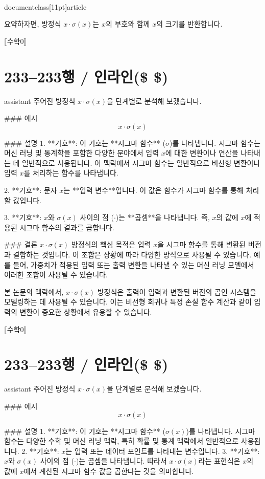 \\documentclass[11pt]{article}
\begin{document}
요약하자면, 방정식 \( x \cdot \sigma(x) \)는 \( x \)의 부호와 함께 \( x \)의 크기를 반환합니다.

⟦수학0⟧

\section*{233–233행 / 인라인(\$ \$) }
assistant
주어진 방정식 \( x \cdot \sigma(x) \)을 단계별로 분석해 보겠습니다.

### 예시
\[ x \cdot \sigma(x) \]

### 설명
1. **기호**: 이 기호는 **시그마 함수** (\(\sigma\))를 나타냅니다. 시그마 함수는 머신 러닝 및 통계학을 포함한 다양한 분야에서 입력 \(x\)에 대한 변환이나 연산을 나타내는 데 일반적으로 사용됩니다. 이 맥락에서 시그마 함수는 일반적으로 비선형 변환이나 입력 \(x\)를 처리하는 함수를 나타냅니다.

2. **기호**: 문자 \(x\)는 **입력 변수**입니다. 이 값은 함수가 시그마 함수를 통해 처리할 값입니다.

3. **기호**: \(x\)와 \(\sigma(x)\) 사이의 점 (\(\cdot\))는 **곱셈**을 나타냅니다. 즉, \(x\)의 값에 \(x\)에 적용된 시그마 함수의 결과를 곱합니다.

### 결론
\( x \cdot \sigma(x) \) 방정식의 핵심 목적은 입력 \(x\)을 시그마 함수를 통해 변환된 버전과 결합하는 것입니다. 이 조합은 상황에 따라 다양한 방식으로 사용될 수 있습니다. 예를 들어, 가중치가 적용된 입력 또는 출력 변환을 나타낼 수 있는 머신 러닝 모델에서 이러한 조합이 사용될 수 있습니다.

본 논문의 맥락에서, \( x \cdot \sigma(x) \) 방정식은 출력이 입력과 변환된 버전의 곱인 시스템을 모델링하는 데 사용될 수 있습니다. 이는 비선형 회귀나 특정 손실 함수 계산과 같이 입력의 변환이 중요한 상황에서 유용할 수 있습니다.

⟦수학0⟧

\section*{233–233행 / 인라인(\$ \$) }
assistant
주어진 방정식 \( x \cdot \sigma(x) \)을 단계별로 분석해 보겠습니다.

### 예시
\[ x \cdot \sigma(x) \]

### 설명
1. **기호**: 이 기호는 **시그마 함수** (\(\sigma(x)\))를 나타냅니다. 시그마 함수는 다양한 수학 및 머신 러닝 맥락, 특히 확률 및 통계 맥락에서 일반적으로 사용됩니다.
2. **기호**: \(x\)는 입력 또는 데이터 포인트를 나타내는 변수입니다.
3. **기호**: \(x\)와 \(\sigma(x)\) 사이의 점 (\(\cdot\))는 곱셈을 나타냅니다. 따라서 \(x \cdot \sigma(x)\)라는 표현식은 \(x\)의 값에 \(x\)에서 계산된 시그마 함수 값을 곱한다는 것을 의미합니다.
\end{document}
